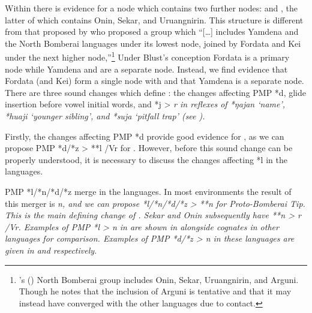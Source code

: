Within  there is evidence for a  node which contains two further nodes: 
and , the latter of which contains Onin, Sekar, and Uruangnirin.
This structure is different from that proposed by \citet[279]{Blust1993}
who proposed a group which “[{\ldots}] includes Yamdena
and the North Bomberai languages under its lowest node,
joined by Fordata and Kei under the next higher node,”\footnote{
		\citeauthor{Blust1993}'s (\citeyear[273f]{Blust1993})
		North Bomberai group includes Onin,
		Sekar, Uruangnirin, and Arguni.
		Though he notes that the inclusion of Arguni is tentative
		and that it may instead have converged with the other languages
		due to contact.}
Under Blust’s conception Fordata is a primary
node while Yamdena and  are a separate node.
Instead, we find evidence that Fordata (and Kei) form a single
node with 
and that Yamdena is a separate node.
There are three sound changes which define :
the changes affecting PMP *d,
glide insertion before vowel initial words,
and *j > \it{r} in reflexes of *ŋajan ‘name’,
*huaji ‘younger sibling’, and *suja ‘pitfall trap’ (see ).

Firstly, the changes affecting PMP *d provide good evidence for
, as we can propose PMP *d/*z > **l /{\gap}Vr for .
However, before this sound change can be properly understood,
it is necessary to discuss the changes affecting *l in the  languages.

PMP *l/*n/*d/*z merge in the  languages.
In most environments the result of this merger is \it{n},
and we can propose *l/*n/*d/*z > **n for Proto-Bomberai Tip.
This is the main defining change of .
Sekar and Onin subsequently have **n > \it{r} /{\gap}Vr.
Examples of PMP *l > \it{n} in  are shown in
 alongside cognates in other  languages for comparison.
Examples of PMP *d/*z > \it{n} in these languages are given in
 and  respectively.

